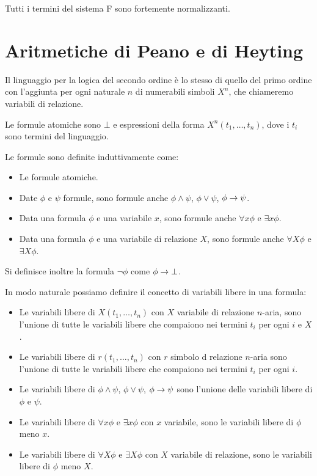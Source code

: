 \documentclass[]{marticle}
\begin{document}
\begin{block} [Teorema]
    Tutti i termini del sistema F sono fortemente normalizzanti.
\end{block}


\section{Aritmetiche di Peano e di Heyting}

\begin{block}[Definizione]
    Il linguaggio per la logica del secondo ordine \`e lo stesso di quello del
    primo ordine con l'aggiunta per ogni naturale $n$ di numerabili simboli
    $X^n$, che chiameremo variabili di relazione. 
    
    Le formule atomiche sono $\bot$ e espressioni della forma $X^n(t_1, \dots,
    t_n)$, dove i $t_i$ sono termini del linguaggio.

    Le formule sono definite induttivamente come:
    \begin{itemize}
        \item Le formule atomiche.
        \item Date $\phi$ e $\psi$ formule, sono formule anche $\phi \land
            \psi$, $\phi \lor \psi$, $\phi \rightarrow \psi$.
        \item Data una formula $\phi$ e una variabile $x$, sono formule anche
            $\forall x \phi$ e $\exists x \phi$.
        \item Data una formula $\phi$ e una variabile di relazione $X$, sono
            formule anche $\forall X \phi$ e $\exists X \phi$.
    \end{itemize}
    Si definisce inoltre la formula $\lnot \phi$ come $\phi \rightarrow \bot$.
\end{block} 

In modo naturale possiamo definire il concetto di variabili libere in una
formula:
\begin{block}[Definizione]
    \begin{itemize} 
        \item Le variabili libere di $X(t_1, \dots, t_n)$ con $X$ variabile di
            relazione $n$-aria, sono l'unione di tutte le variabili libere che
            compaiono nei termini $t_i$ per ogni $i$ e $X$.
        \item Le variabili libere di $r(t_1, \dots, t_n)$ con $r$ simbolo d
            relazione $n$-aria sono l'unione di tutte le variabili libere che
            compaiono nei termini $t_i$ per ogni $i$.
        \item Le variabili libere di $\phi \land \psi$, $\phi \lor \psi$, $\phi
            \rightarrow \psi$ sono l'unione delle variabili libere di $\phi$ e $\psi$.
        \item Le variabili libere di $\forall x \phi$ e $\exists x \phi$ con $x$
            variabile, sono le variabili libere di $\phi$ meno $x$.
        \item Le variabili libere di $\forall X \phi$ e $\exists X \phi$ con $X$
            variabile di relazione, sono le variabili libere di $\phi$ meno $X$.
    \end{itemize} 
\end{block}
\end{document}
